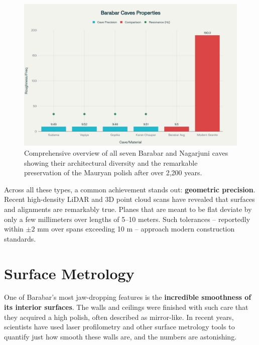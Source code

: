 \documentclass[11pt]{article}
\begin{document}
\begin{figure}[H]
\centering
\includegraphics[width=\linewidth]{barabar_caves_complete.png}
\caption{Comprehensive overview of all seven Barabar and Nagarjuni caves showing their architectural diversity and the remarkable preservation of the Mauryan polish after over 2,200 years.}
\label{fig:caves_complete}
\end{figure}

Across all these types, a common achievement stands out: \textbf{geometric precision}. Recent high-density LiDAR and 3D point cloud scans have revealed that surfaces and alignments are remarkably true. Planes that are meant to be flat deviate by only a few millimeters over lengths of 5--10 meters. Such tolerances -- reportedly within $\pm 2$ mm over spans exceeding 10 m -- approach modern construction standards.

\section{Surface Metrology}

One of Barabar's most jaw-dropping features is the \textbf{incredible smoothness of its interior surfaces}. The walls and ceilings were finished with such care that they acquired a high polish, often described as mirror-like. In recent years, scientists have used laser profilometry and other surface metrology tools to quantify just how smooth these walls are, and the numbers are astonishing.
\end{document}
